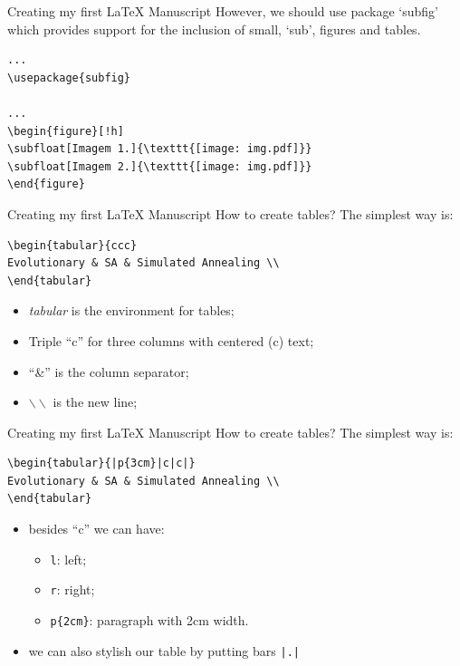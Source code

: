 \begin{frame}[fragile]{Creating my first \LaTeX{} Manuscript}
However, we should use package `subfig' which provides support for the inclusion of small, ‘sub’, figures and tables.
\scriptsize
\begin{verbatim}
...
\usepackage{subfig}

...
\begin{figure}[!h]
\subfloat[Imagem 1.]{\texttt{[image: img.pdf]}}
\subfloat[Imagem 2.]{\texttt{[image: img.pdf]}}
\end{figure}
\end{verbatim}
\end{frame}


\begin{frame}[fragile]{Creating my first \LaTeX{} Manuscript}
How to create tables? The simplest way is:
\footnotesize
\begin{verbatim}
\begin{tabular}{ccc}
Evolutionary & SA & Simulated Annealing \\ 
\end{tabular}
\end{verbatim}
\begin{itemize}
\item \emph{tabular} is the environment for tables;
\item Triple ``c'' for three columns with centered (c) text;
\item ``\&'' is the column separator;
\item $\backslash\backslash$  is the new line;
\end{itemize}
\end{frame}


\begin{frame}[fragile]{Creating my first \LaTeX{} Manuscript}
How to create tables? The simplest way is:
\footnotesize
\begin{verbatim}
\begin{tabular}{|p{3cm}|c|c|}
Evolutionary & SA & Simulated Annealing \\ 
\end{tabular}
\end{verbatim}
\begin{itemize}
\item besides ``c'' we can have:
      \begin{itemize}
        \item \verb!l!: left;
        \item \verb!r!: right;
        \item \verb!p{2cm}!: paragraph with 2cm width.
      \end{itemize}
\item we can also stylish our table by putting bars \verb!|.|!
\end{itemize}
\end{frame}


